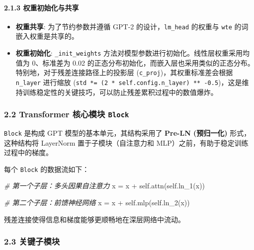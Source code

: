 \documentclass[a4paper]{article}
\newenvironment{Shaded}{}{}
\newcommand{\CommentTok}[1]{\textcolor[rgb]{0.38,0.63,0.69}{\textit{#1}}}
\newcommand{\NormalTok}[1]{#1}
\newcommand{\OperatorTok}[1]{\textcolor[rgb]{0.40,0.40,0.40}{#1}}
\newcommand{\VariableTok}[1]{\textcolor[rgb]{0.10,0.09,0.49}{#1}}
\providecommand{\tightlist}{%
  \setlength{\itemsep}{0pt}\setlength{\parskip}{0pt}}
\begin{document}
\paragraph{2.1.3
权重初始化与共享}\label{ux6743ux91cdux521dux59cbux5316ux4e0eux5171ux4eab}

\begin{itemize}
\tightlist
\item
  \textbf{权重共享}: 为了节约参数并遵循 GPT-2 的设计，\texttt{lm\_head}
  的权重与 \texttt{wte} 的词嵌入权重是共享的。
\item
  \textbf{权重初始化}: \texttt{\_init\_weights}
  方法对模型参数进行初始化。线性层权重采用均值为 0、标准差为 0.02
  的正态分布初始化，而嵌入层也采用类似的正态分布。特别地，对于残差连接路径上的投影层
  (\texttt{c\_proj})，其权重标准差会根据 \texttt{n\_layer} 进行缩放
  (\texttt{std\ *=\ (2\ *\ self.config.n\_layer)\ **\ -0.5})，这是维持训练稳定性的关键技巧，可以防止残差累积过程中的数值爆炸。
\end{itemize}

\subsubsection{\texorpdfstring{2.2 Transformer 核心模块
\texttt{Block}}{2.2 Transformer 核心模块 Block}}\label{transformer-ux6838ux5fc3ux6a21ux5757-block}

\texttt{Block} 是构成 GPT 模型的基本单元，其结构采用了 \textbf{Pre-LN
(预归一化)} 形式，这种结构将 LayerNorm 置于子模块（自注意力和
MLP）之前，有助于稳定训练过程中的梯度。

每个 \texttt{Block} 的数据流如下：

\begin{Shaded}
\begin{Highlighting}[]
\CommentTok{\# 第一个子层：多头因果自注意力}
\NormalTok{x }\OperatorTok{=}\NormalTok{ x }\OperatorTok{+} \VariableTok{self}\NormalTok{.attn(}\VariableTok{self}\NormalTok{.ln\_1(x))}

\CommentTok{\# 第二个子层：前馈神经网络}
\NormalTok{x }\OperatorTok{=}\NormalTok{ x }\OperatorTok{+} \VariableTok{self}\NormalTok{.mlp(}\VariableTok{self}\NormalTok{.ln\_2(x))}
\end{Highlighting}
\end{Shaded}

残差连接使得信息和梯度能够更顺畅地在深层网络中流动。

\subsubsection{2.3 关键子模块}\label{ux5173ux952eux5b50ux6a21ux5757}
\end{document}
